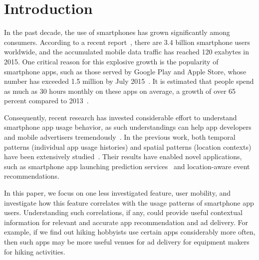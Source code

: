 \section{Introduction}\label{intro}

In the past decade, the use of smartphones has grown significantly among consumers.
According to a recent report~\cite{Ericsson}, there are 3.4 billion smartphone users worldwide,
and the accumulated mobile data traffic has reached 120 exabytes in 2015.
One critical reason for this explosive growth is the popularity of smartphone apps,
such as those served by Google Play and Apple Store,
whose number has exceeded 1.5 million by July 2015~\cite{Statista}.
It is estimated that people spend as much as 30 hours monthly on these apps on average,
a growth of over 65 percent compared to 2013~\cite{Nielsen}.

Consequently, recent research has invested considerable effort to understand smartphone app usage behavior,
as such understandings can help app developers and mobile advertisers tremendously~\cite{xu2011identifying,yang2015characterizing}.
In the previous work, both temporal patterns (\eg individual app usage histories) and
spatial patterns (\eg location contexts) have been extensively studied~\cite{meng2014analyzing}.
Their results have enabled novel applications,
such as smartphone app launching prediction services~\cite{yan2012fast}
and location-aware event recommendations.

In this paper, we focus on one less investigated feature, user mobility,
and investigate how this feature correlates with the usage patterns of smartphone app users.
Understanding such correlations, if any, could provide useful contextual information
for relevant and accurate app recommendation and ad delivery.
For example, if we find out hiking hobbyists use certain apps considerably more often,
then such apps may be more useful venues for ad delivery for equipment makers for hiking activities.

